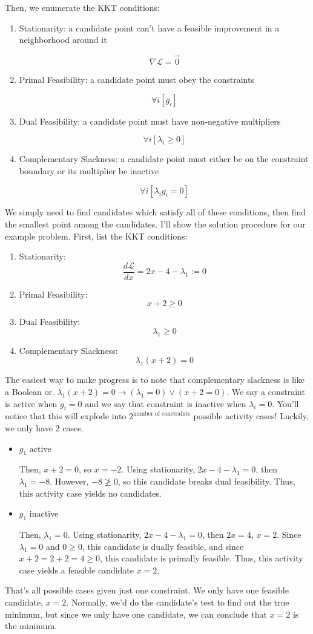 Then, we enumerate the KKT conditions:
\begin{enumerate}
    \item Stationarity: a candidate point can't have a feasible improvement in a neighborhood around it

    $$\nabla \mathcal{L} = \vec{0}$$

    \item Primal Feasibility: a candidate point must obey the constraints

    $$\forall i [g_i]$$

    \item Dual Feasibility: a candidate point must have non-negative multipliers

    $$\forall i[\lambda_i \geq 0]$$

    \item Complementary Slackness: a candidate point must either be on the constraint boundary or its multiplier be inactive

    $$\forall i [\lambda_ig_i=0]$$
\end{enumerate}
We simply need to find candidates which satisfy all of these conditions, then find the smallest point among the candidates. I'll show the solution procedure for our example problem. First, list the KKT conditions:
\begin{enumerate}
    \item Stationarity:
    $$\frac{d\mathcal{L}}{dx} = 2x-4-\lambda_1 := 0$$
    \item Primal Feasibility:
    $$x+2\geq 0$$
    \item Dual Feasibility:
    $$\lambda_1 \geq 0$$
    \item Complementary Slackness:
    $$\lambda_1(x+2)=0$$
\end{enumerate}
The easiest way to make progress is to note that complementary slackness is like a Boolean or. $\lambda_1(x+2)=0 \longrightarrow (\lambda_1=0)\lor (x+2=0)$. We say a constraint is active when $g_i=0$ and we say that constraint is inactive when $\lambda_i=0$. You'll notice that this will explode into $2^{\text{number of constraints}}$ possible activity cases! Luckily, we only have 2 cases.\begin{itemize}
    \item $g_1$ active

    Then, $x+2=0$, so $x=-2$. Using stationarity, $2x-4-\lambda_1=0$, then $\lambda_1=-8$. However, $-8 \ngeq 0$, so this candidate breaks dual feasibility. Thus, this activity case yields no candidates.

    \item $g_1$ inactive

    Then, $\lambda_1=0$. Using stationarity, $2x-4-\lambda_1=0$, then $2x=4$, $x=2$. Since $\lambda_1=0$ and $0\geq0$, this candidate is dually feasible, and since $x+2=2+2=4\geq 0$, this candidate is primally feasible. Thus, this activity case yields a feasible candidate $x=2$.
\end{itemize}
That's all possible cases given just one constraint. We only have one feasible candidate, $x=2$. Normally, we'd do the candidate's test to find out the true minimum, but since we only have one candidate, we can conclude that $x=2$ is the minimum.